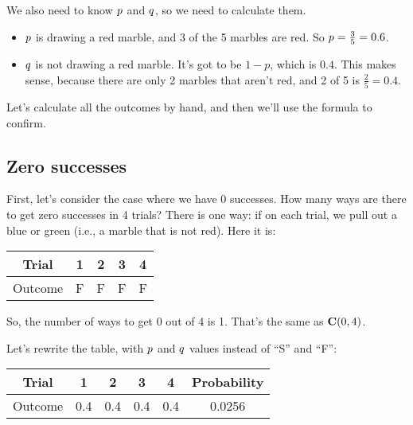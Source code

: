 \documentclass[../../../main.tex]{subfiles}
\begin{document}
We also need to know $\success/$ and $\failure/$, so we need to calculate them.

\begin{itemize}
  \item $\success/$ is drawing a red marble, and 3 of the 5 marbles are red. So $\success/ = \frac{3}{5} = 0.6$.
  \item $\failure/$ is not drawing a red marble. It's got to be $1 - p$, which is $0.4$. This makes sense, because there are only 2 marbles that aren't red, and 2 of 5 is $\frac{2}{5} = 0.4$.
\end{itemize}

Let's calculate all the outcomes by hand, and then we'll use the formula to confirm.


\subsection{Zero successes}

First, let's consider the case where we have 0 successes. How many ways are there to get zero successes in 4 trials? There is one way: if on each trial, we pull out a blue or green (i.e., a marble that is not red). Here it is:

\begin{center}
  \begin{tabular}{| c | c | c | c | c |}
    \hline
    \textbf{Trial} & \textbf{1} & \textbf{2} & \textbf{3} & \textbf{4} \\ \hline
  Outcome & F & F & F & F \\ \hline
  \end{tabular}
\end{center}

\noindent
So, the number of ways to get 0 out of 4 is 1. That's the same as $\mathbf{C}(0, 4)$. 

Let's rewrite the table, with $\success/$ and $\failure/$ values instead of ``S'' and ``F'':

\begin{center}
  \begin{tabular}{| c | c | c | c | c | c |}
    \hline
    \textbf{Trial} & \textbf{1} & \textbf{2} & \textbf{3} & \textbf{4} & \textbf{Probability} \\ \hline
  Outcome & 0.4 & 0.4 & 0.4 & 0.4 & 0.0256 \\ \hline
  \end{tabular}
\end{center}
\end{document}
